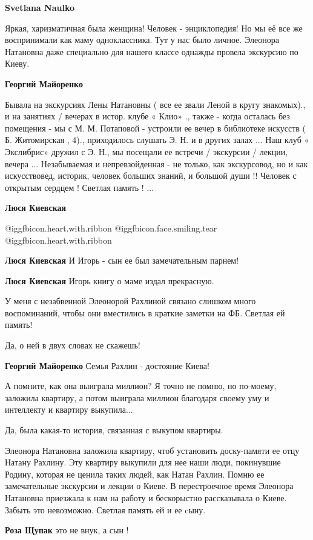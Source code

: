 \begin{itemize} %
\textbf{Svetlana Naulko} 

Яркая, харизматичная была женщина! Человек - энциклопедия! Но мы её все же
воспринимали как маму одноклассника. Тут у нас было личное. Элеонора Натановна
даже специально для нашего классе однажды провела экскурсию по Киеву.

\textbf{Георгий Майоренко} 

Бывала на экскурсиях Лены Натановны ( все ее звали Леной в кругу знакомых)., и
на занятиях / вечерах в истор. клубе « Клио» ., также - когда осталась без
помещения - мы с М. М. Потаповой - устроили ее вечер в библиотеке искусств ( Б.
Житомирская , 4)., приходилось слушать Э. Н. и в других залах ... Наш клуб «
Экслибрис» дружил с Э. Н., мы посещали ее встречи / экскурсии / лекции, вечера
... Незабываемая и непревзойденная - не только, как экскурсовод, но и как
искусствовед, историк, человек больших знаний, и большой души !! Человек с
открытым сердцем ! Светлая память ! ...

\textbf{Люся Киевская}  

@igg{fbicon.heart.with.ribbon} @igg{fbicon.face.smiling.tear}
@igg{fbicon.heart.with.ribbon} 

\textbf{Люся Киевская} И Игорь - сын ее был замечательным парнем!

\textbf{Люся Киевская} Игорь книгу о маме издал прекрасную.
\end{itemize} %


У меня с незабвенной Элеонорой Рахлиной связано слишком много воспоминаний,
чтобы они вместились в краткие заметки на ФБ. Светлая ей память!

Да, о ней в двух словах не скажешь!

\begin{itemize} %
\textbf{Георгий Майоренко} Семья Рахлин - достояние Киева!
\end{itemize} %


А помните, как она выиграла миллион? Я точно не помню, но по-моему, заложила
квартиру, а потом выиграла миллион благодаря своему уму и интеллекту и квартиру
выкупила...

Да, была какая-то история, связанная с выкупом квартиры.


Элеонора Натановна заложила квартиру, чтоб установить доску-памяти ее отцу
Натану Рахлину. Эту квартиру выкупили для нее наши люди, покинувшие
Родину, которая не ценила таких людей, как Натан Рахлин. Помню ее замечательные
экскурсии и лекции о Киеве. В перестроечное время Элеонора Натановна приезжала
к нам на работу и бескорыстно рассказывала о Киеве. Забыть это невозможно.
Светлая память ей и ее cыну.

\textbf{Роза Щупак} это не внук, а сын !
